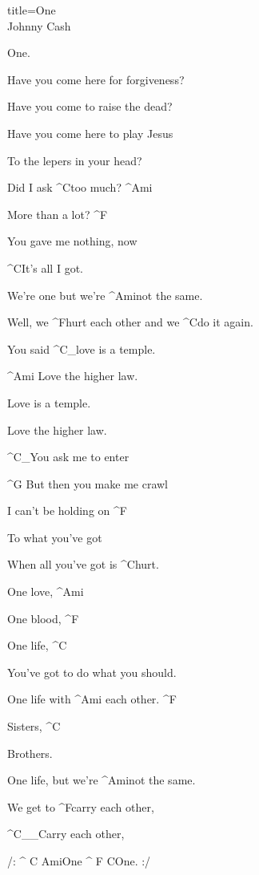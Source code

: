 \begin{song}{title=\centering One \\\normalsize Johnny Cash  \vspace*{-0.3cm}}
{\begin{minipage}[t]{0.55\textwidth}
{	One.

\sloka    
	Have you come here for forgiveness?

	Have you come to raise the dead?

	Have you come here to play Jesus

	To the lepers in your head?

}
\end{minipage}\begin{minipage}[t]{0.55\textwidth}\setlength{\parindent}{0.45cm}\vspace*{0.0cm}  %
{\parskip=0pt

	Did I ask ^{\small C}too much? ^{\small Ami}

	More than a lot? ^{\small F}

	You gave me nothing, now
	   
	^{\small C}It's all I got.

	We're one but we're ^{\small Ami}not the same.

	Well, we ^{\small F}hurt each other and we ^{\small C}do it again. 
 
	You said ^{\small C{\color{white}\_}}love is a temple.

	^{\small Ami\,\,}Love the higher law.

	Love is a temple.	

	Love the higher law.

	^{\small C{\color{white}\_}}You ask me to enter

	^{\small G\,\,}But then you make me crawl

	I can't be holding on ^{\small F}
                  
	To what you've got

	When all you've got is ^{\small C}hurt.
  
	One love, ^{\small Ami}

	One blood, ^{\small F}

	One life, ^{\small C}
 
	You've got to do what you should.

	One life with ^{\small Ami\,\,}each other. ^{\small F}
 
 	Sisters, ^{\small C}
 
	Brothers.
   
	One life, but we're ^{\small Ami}not the same.

	We get to ^{\small F}carry each other,

  	^{\small C{\color{white}\_\_}}Carry each other,

  	/: ^{\small \,\,C\,\,Ami}One ^{\small \,\,F\,\,C}One. :/


\normalsize

}
\end{minipage}
}
\setcounter{Slokočet}{0}
\end{song}
